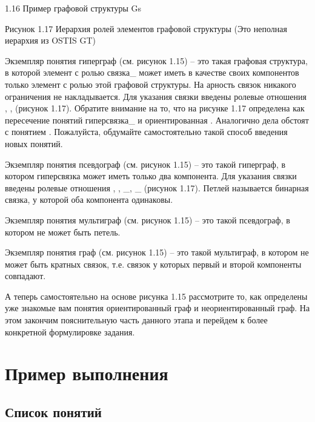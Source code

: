 1.16 Пример графовой структуры Gs
 
Рисунок 1.17 Иерархия ролей элементов графовой структуры (Это неполная иерархия из OSTIS GT)

Экземпляр понятия гиперграф (см. рисунок 1.15) – это такая графовая
структура, в которой элемент с ролью связка_ может иметь в качестве
своих компонентов только элемент с ролью  этой графовой
структуры.  На арность связок никакого ограничения не
накладывается. Для указания связки введены ролевые отношения
, ,  (рисунок
1.17). Обратите внимание на то, что на рисунке 1.17 
определена как пересечение понятий гиперсвязка_ и ориентированная
. Аналогично дела обстоят с понятием
. Пожалуйста, обдумайте самостоятельно такой способ
введения новых понятий.

Экземпляр понятия псевдограф (см. рисунок 1.15) – это такой гиперграф,
в котором гиперсвязка может иметь только два компонента.  Для указания
связки введены ролевые отношения , ,
_, _ (рисунок 1.17). Петлей называется бинарная
связка, у которой оба компонента одинаковы.

Экземпляр понятия мультиграф (см. рисунок 1.15) – это такой
псевдограф, в котором не может быть петель.
 
Экземпляр понятия граф (см. рисунок 1.15) – это такой мультиграф, в
котором не может быть кратных связок, т.е. связок у которых первый и
второй компоненты совпадают.

А теперь самостоятельно на основе рисунка 1.15 рассмотрите то, как
определены уже знакомые вам понятия ориентированный граф и
неориентированный граф. На этом закончим пояснительную часть данного
этапа и перейдем к более конкретной формулировке задания.

\section{Пример выполнения}

\subsection{Список понятий}

